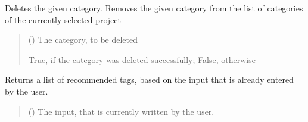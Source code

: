 \documentclass[letterpaper,10pt,english]{sphinxmanual}
\begin{document}
\begin{fulllineitems}
\begin{fulllineitems}
\label{\detokenize{apidoc/src.osm_configurator.control:src.osm_configurator.control.control_interface.IControl.delete_category}}
\pysigstartsignatures
{}
\pysigstopsignatures
\sphinxAtStartPar
Deletes the given category.
Removes the given category from the list of categories of the currently selected project
\begin{quote}\begin{description}
\sphinxAtStartPar
{} ({\hyperref[\detokenize{apidoc/src.osm_configurator.model.project.configuration:src.osm_configurator.model.project.configuration.category.Category}]{}}) \textendash{} The category, to be deleted

\sphinxAtStartPar
True, if the category was deleted successfully; False, otherwise

\sphinxAtStartPar
{}

\end{description}\end{quote}

\end{fulllineitems}


\begin{fulllineitems}
\label{\detokenize{apidoc/src.osm_configurator.control:src.osm_configurator.control.control_interface.IControl.get_list_of_tag_recommendations}}
\pysigstartsignatures
{}
\pysigstopsignatures
\sphinxAtStartPar
Returns a list of recommended tags, based on the input that is already entered by the user.
\begin{quote}\begin{description}
\sphinxAtStartPar
{} () \textendash{} The input, that is currently written by the user.


\end{description}
\end{quote}
\end{fulllineitems}
\end{fulllineitems}
\end{document}
